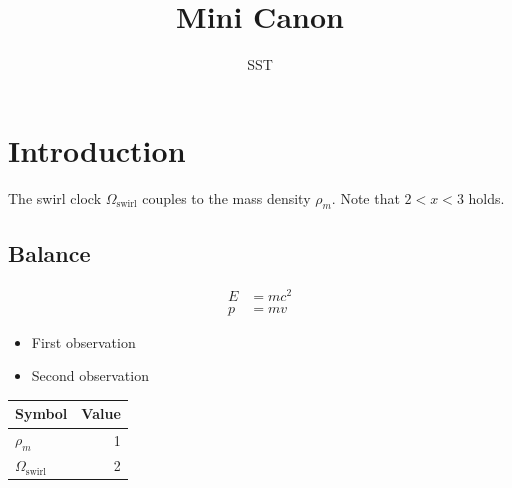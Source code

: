 \documentclass[11pt]{article}
\title{Mini Canon}
\author{SST}
\providecommand{\rhoM}{\rho_{\!m}}
\newcommand{\SwirlClock}{\Omega_{\mathrm{swirl}}}
\begin{document}
\maketitle
\section{Introduction}
The swirl clock $\SwirlClock$ couples to the mass density $\rhoM$. Note that $2 < x < 3$ holds.
\subsection{Balance}
\begin{align}
E &= mc^2 \tag{A1} \\
p &= mv \tag{A2}
\end{align}
\begin{itemize}
\item First observation
\item Second observation
\end{itemize}
\begin{tabular}{lr}
\toprule
Symbol & Value \\
\midrule
$\rhoM$ & 1 \\
$\SwirlClock$ & 2 \\
\bottomrule
\end{tabular}
\end{document}
